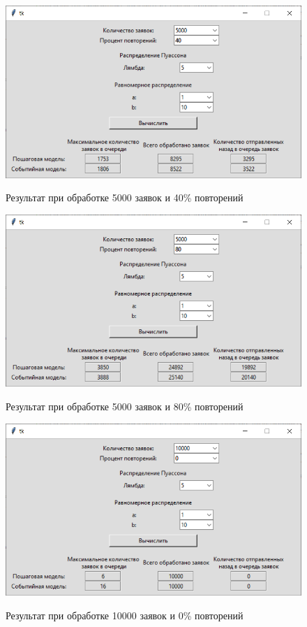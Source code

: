 \documentclass[12pt,a4paper,oneside]{report}
\begin{document}
\begin{figure}[!h]
	\centering
	\includegraphics[scale=0.7]{2_3.png}
	\label{fig:screenshot007}
	\caption{Результат при обработке 5000 заявок и 40\% повторений}
\end{figure}
\clearpage

\begin{figure}[!h]
	\centering
	\includegraphics[scale=0.7]{2_4.png}
	\label{fig:screenshot008}
	\caption{Результат при обработке 5000 заявок и 80\% повторений}
\end{figure}

\begin{figure}[!h]
	\centering
	\includegraphics[scale=0.7]{3_1.png}
	\label{fig:screenshot009}
	\caption{Результат при обработке 10000 заявок и 0\% повторений}
\end{figure}
\end{document}
